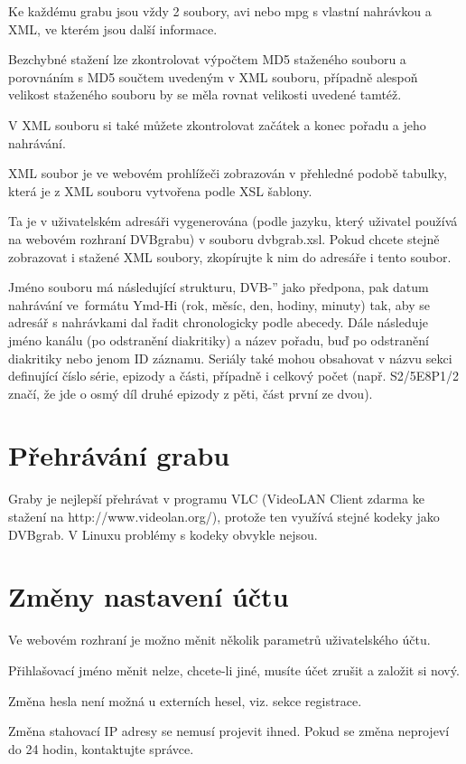 Ke každému grabu jsou vždy 2 soubory, avi nebo mpg s vlastní nahrávkou a XML, ve kterém jsou další informace.

Bezchybné stažení lze zkontrolovat výpočtem MD5 staženého souboru a porovnáním s MD5 součtem uvedeným v XML souboru, případně alespoň velikost staženého souboru by se měla rovnat velikosti uvedené tamtéž.

V XML souboru si také můžete zkontrolovat začátek a konec pořadu a jeho nahrávání.

XML soubor je ve webovém prohlížeči zobrazován v přehledné podobě tabulky, která je z XML souboru vytvořena podle XSL šablony.

Ta je v uživatelském adresáři vygenerována (podle jazyku, který uživatel používá na webovém rozhraní DVBgrabu) v souboru dvbgrab.xsl. Pokud chcete stejně zobrazovat i stažené XML soubory, zkopírujte k nim do adresáře i tento soubor.

Jméno souboru má následující strukturu, \quotedblbase DVB-'' jako předpona, pak datum nahrávání ve~formátu Ymd-Hi (rok, měsíc, den, hodiny, minuty) tak, aby se adresář s nahrávkami dal řadit chronologicky podle abecedy. Dále následuje jméno kanálu (po odstranění diakritiky) a název pořadu, buď po odstranění diakritiky nebo jenom ID záznamu. Seriály také mohou obsahovat v názvu sekci definující číslo série, epizody a části, případně i celkový počet (např. S2/5E8P1/2 značí, že jde o osmý díl druhé epizody z pěti, část první ze dvou).

\section{Přehrávání grabu}
Graby je nejlepší přehrávat v programu VLC (VideoLAN Client zdarma ke stažení na \linebreak[4]http://www.videolan.org/), protože ten využívá stejné kodeky jako DVBgrab. V Linuxu problémy s kodeky obvykle nejsou.
\vfil
\pagebreak
\section{Změny nastavení účtu}
Ve webovém rozhraní je možno měnit několik parametrů uživatelského účtu. 

Přihlašovací jméno měnit nelze, chcete-li jiné, musíte účet zrušit a založit si nový. 

Změna hesla není možná u externích hesel, viz. sekce registrace.

Změna stahovací IP adresy se nemusí projevit ihned. Pokud se změna neprojeví do 24 hodin, kontaktujte správce.

